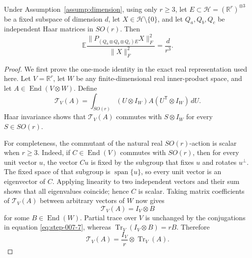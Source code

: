 \begin{lemma}
\label{lem:step-007-sequential-twirl}
Under Assumption~\ref{assump:dimension}, using only \(r\ge3\), let
\(E\subset\mathcal H=(\mathbb R^r)^{\otimes3}\) be a fixed subspace of
dimension \(d\), let \(X\in\mathcal H\setminus\{0\}\), and let
\(Q_a,Q_b,Q_c\) be independent Haar matrices in \(SO(r)\). Then
\begin{equation}
  \mathbb E\frac{\|P_{(Q_a\otimes Q_b\otimes Q_c)E}X\|_F^2}
  {\|X\|_F^2}
  =\frac d{r^3}.                                             \label{eq:step-007-6}
\end{equation}

\end{lemma}

\begin{proof}
We first prove the one-mode identity in the exact
real representation used here. Let \(V=\mathbb R^r\), let \(W\) be any
finite-dimensional real inner-product space, and let
\(A\in\operatorname{End}(V\otimes W)\). Define
\begin{equation}
  \mathcal T_V(A)
  =\int_{SO(r)}(U\otimes I_W)A(U^{\mathsf T}\otimes I_W)\,dU. \label{eq:step-007-7}
\end{equation}
Haar invariance shows that \(\mathcal T_V(A)\) commutes with
\(S\otimes I_W\) for every \(S\in SO(r)\).

For completeness, the commutant of the natural real \(SO(r)\)-action is
scalar when \(r\ge3\). Indeed, if \(C\in\operatorname{End}(V)\) commutes
with \(SO(r)\), then for every unit vector \(u\), the vector \(Cu\) is fixed
by the subgroup that fixes \(u\) and rotates \(u^\perp\). The fixed space of
that subgroup is \(\operatorname{span}\{u\}\), so every unit vector is an
eigenvector of \(C\). Applying linearity to two independent vectors and their
sum shows that all eigenvalues coincide; hence \(C\) is scalar. Taking matrix
coefficients of \(\mathcal T_V(A)\) between arbitrary vectors of \(W\) now
gives
\[
  \mathcal T_V(A)=I_V\otimes B
\]
for some \(B\in\operatorname{End}(W)\). Partial trace over \(V\) is unchanged
by the conjugations in equation \eqref{eq:step-007-7}, whereas
\(\operatorname{Tr}_V(I_V\otimes B)=rB\). Therefore
\begin{equation}
  \boxed{\mathcal T_V(A)
  =\frac{I_V}{r}\otimes\operatorname{Tr}_V(A).}             \label{eq:step-007-8}
\end{equation}


\end{proof}

